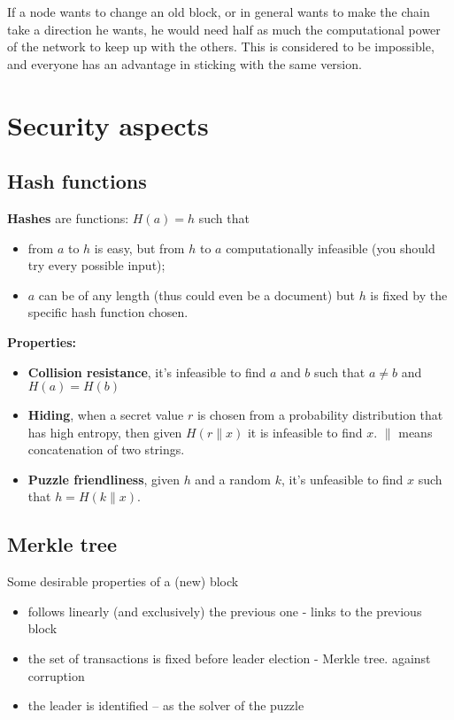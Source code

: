 If a node wants to change an old block, or in general wants to make the chain take a direction he wants, he would need half as much the computational power of the network to keep up with the others. This is considered to be impossible, and everyone has an advantage in sticking with the same version.

\section{Security aspects}
\subsection{Hash functions}

\textbf{Hashes} are functions: $H( a) =h$ such that
\begin{itemize}
	\item from $a$ to $h$ is easy, but from $h$ to $a$ computationally infeasible (you should try every possible input);
	\item $a$ can be of any length (thus could even be a document) but $h$ is fixed by the specific hash function chosen.
\end{itemize}

\textbf{Properties:}
\begin{itemize}
	\item \textbf{Collision resistance}, it's infeasible to find $a$ and $b$ such that $a\neq b$ and $H( a) =H( b)$
	\item \textbf{Hiding}, when a secret value $r$ is chosen from a probability distribution that has high entropy, then given $H( r\| x)$ it is infeasible to find $x$. $\| $ means concatenation of two strings.
	\item \textbf{Puzzle friendliness}, given $h$ and a random $k$, it's unfeasible to find $x$ such that $h=H( k\| x)$.
\end{itemize}
\subsection{Merkle tree}

Some desirable properties of a (new) block
\begin{itemize}
	\item follows linearly (and exclusively) the previous one - links to the previous block
	\item the set of transactions is fixed before leader election - Merkle tree. against corruption
	\item the leader is identified – as the solver of the puzzle
\end{itemize}

